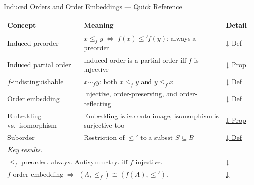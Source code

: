 \begin{toolkitbox}{Induced Orders and Order Embeddings --- Quick Reference}
\small
\begin{tabular}{l l l}
\toprule
\textbf{Concept} & \textbf{Meaning} & \textbf{Detail} \\
\midrule
Induced preorder    & $x \leq_f y \;\Leftrightarrow\; f(x) \leq' f(y)$; always a preorder  & \hyperref[def:induced-order]{↓ Def} \\
Induced partial order & Induced order is a partial order iff $f$ is injective              & \hyperref[prop:induced-poset]{↓ Prop} \\
$f$-indistinguishable & $x \sim_f y$: both $x \leq_f y$ and $y \leq_f x$                   & \hyperref[def:f-indist]{↓ Def} \\
Order embedding     & Injective, order-preserving, and order-reflecting                     & \hyperref[def:order-embedding]{↓ Def} \\
Embedding vs.\ isomorphism & Embedding is iso onto image; isomorphism is surjective too & \hyperref[prop:embedding-iso]{↓ Prop} \\
Suborder            & Restriction of $\leq'$ to a subset $S \subseteq B$                   & \hyperref[def:suborder]{↓ Def} \\
\midrule
\multicolumn{2}{l}{\textit{Key results:}} & \\
\midrule
\multicolumn{2}{l}{$\leq_f$ preorder: always. \quad Antisymmetry: iff $f$ injective.}       & \hyperref[prop:induced-poset]{↓} \\
\multicolumn{2}{l}{$f$ order embedding $\Rightarrow$ $(A,\leq_f) \cong (f(A), \leq')$.}    & \hyperref[prop:embedding-iso]{↓} \\
\bottomrule
\end{tabular}
\end{toolkitbox}


